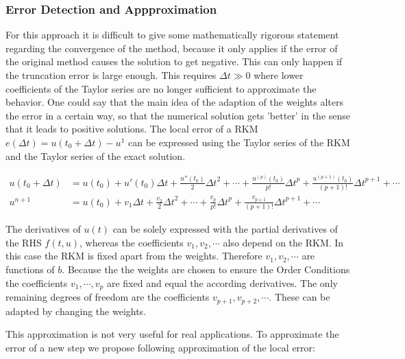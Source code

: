 \documentclass[a4paper]{article}
\numberwithin{equation}{section}
\theoremstyle{plain}
\theoremstyle{definition}
\numberwithin{theorem}{section}
\newcommand{\dt}{{\Delta t}}
\newcommand{\1}{\mathbbm{1}}
\begin{document}
\subsubsection{Error Detection and Appproximation}
For this approach it is difficult to give some mathematically rigorous statement regarding the convergence of the method, because it only applies if the error of the original method causes the solution to get negative. This can only happen if the truncation error is large enough. This requires $\dt \gg 0$ where lower coefficients of the Taylor series are no longer sufficient to approximate the behavior. 
One could say that the main idea of the adaption of the weights alters the error in a certain way, so that the numerical solution gets 'better' in the sense that it leads to positive solutions. 
The local error of a RKM $e(\dt) =u(t_0 + \dt) - u^1$ can be expressed using the Taylor series of the RKM and the Taylor series of the exact solution. %

\begin{align}\label{eq:Taylor_sol_ref}
u(t_0 + \dt) &= u(t_0) + u'(t_0) \dt + \frac{u''(t_0)}{2} \dt^2 + \cdots + \frac{u^{(p)}(t_0)}{p!} \dt^p + \frac{u^{(p+1)}(t_0)}{(p+1)!} \dt^{p+1} + \cdots \\
u^{n+1} &= u(t_0)  + v_1 \dt + \frac{v_2}{2} \dt^2 + \cdots + \frac{v_p}{p!} \dt^p + \frac{v_{p+1}}{(p+1)!} \dt^{p+1} + \cdots 
\end{align}

The derivatives of $u(t)$ can be solely expressed with the partial derivatives of the RHS $f(t,u)$, whereas the coefficients $v_1,v_2,\cdots$ also depend on the RKM. 
In this case the RKM is fixed apart from the weights. 
Therefore $v_1,v_2,\cdots$ are functions of $b$.
Because the the weights are chosen to ensure the Order Conditions the coefficients $v_1,\cdots,v_p$ are fixed and equal the according derivatives. 
The only remaining degrees of freedom are the coefficients $v_{p+1},v_{p+2},\cdots$.
These can be adapted by changing the weights.

This approximation is not very useful for real applications. 
To approximate the error of a new step we propose following approximation of the local error:
\end{document}
